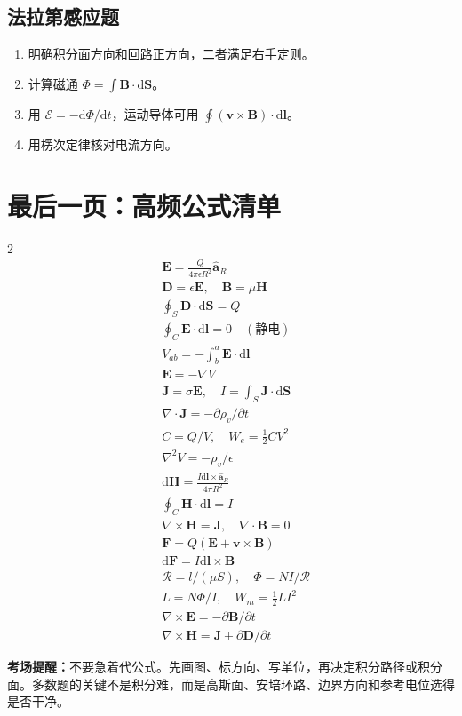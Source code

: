 \documentclass[11pt,a4paper]{ctexart}
\newcommand{\dd}{\mathrm{d}}
\newcommand{\uv}[1]{\hat{\bm a}_{#1}}
\newcommand{\E}{\bm E}
\newcommand{\D}{\bm D}
\newcommand{\B}{\bm B}
\newcommand{\Hf}{\bm H}
\newcommand{\J}{\bm J}
\newcommand{\curl}{\nabla\times}
\newcommand{\divg}{\nabla\cdot}
\newcommand{\grad}{\nabla}
\begin{document}
\subsection{法拉第感应题}
\begin{enumerate}
\item 明确积分面方向和回路正方向，二者满足右手定则。
\item 计算磁通 $\Phi=\int\B\cdot\dd\bm S$。
\item 用 $\mathcal E=-\dd\Phi/\dd t$，运动导体可用 $\oint(\bm v\times\B)\cdot\dd\bm l$。
\item 用楞次定律核对电流方向。
\end{enumerate}

\section{最后一页：高频公式清单}
\begin{multicols}{2}
\begin{align*}
&\E=\frac{Q}{4\pi\epsilon R^2}\uv R\\
&\D=\epsilon\E,\quad \B=\mu\Hf\\
&\oint_S\D\cdot\dd\bm S=Q\\
&\oint_C\E\cdot\dd\bm l=0\quad(\text{静电})\\
&V_{ab}=-\int_b^a\E\cdot\dd\bm l\\
&\E=-\grad V\\
&\J=\sigma\E,\quad I=\int_S\J\cdot\dd\bm S\\
&\divg\J=-\partial\rho_v/\partial t\\
&C=Q/V,\quad W_e=\tfrac12CV^2\\
&\nabla^2V=-\rho_v/\epsilon\\
&\dd\Hf=\frac{I\dd\bm l\times\uv R}{4\pi R^2}\\
&\oint_C\Hf\cdot\dd\bm l=I\\
&\curl\Hf=\J,\quad \divg\B=0\\
&\bm F=Q(\E+\bm v\times\B)\\
&\dd\bm F=I\dd\bm l\times\B\\
&\mathcal R=l/(\mu S),\quad \Phi=NI/\mathcal R\\
&L=N\Phi/I,\quad W_m=\tfrac12LI^2\\
&\curl\E=-\partial\B/\partial t\\
&\curl\Hf=\J+\partial\D/\partial t
\end{align*}
\end{multicols}

\textbf{考场提醒：}不要急着代公式。先画图、标方向、写单位，再决定积分路径或积分面。多数题的关键不是积分难，而是高斯面、安培环路、边界方向和参考电位选得是否干净。
\end{document}

